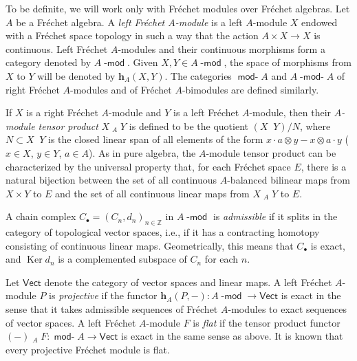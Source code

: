 \documentclass[12pt,reqno]{amsart}
\theoremstyle{definition}
\begin{document}
To be definite, we will work only with Fr\'echet modules over Fr\'echet algebras.
Let $A$ be a Fr\'echet algebra.
A {\em left Fr\'echet $A$-module} is a left $A$-module $X$ endowed with
a Fr\'echet space topology in such a way that the action $A\times X\to X$
is continuous.
Left Fr\'echet $A$-modules and their continuous morphisms form a category
denoted by $A{\mbox{-}\!\mathop{\mathsf{mod}}}$. Given $X,Y\in A{\mbox{-}\!\mathop{\mathsf{mod}}}$,
the space of morphisms from $X$ to $Y$ will be denoted by ${\mathbf h}_A(X,Y)$.
The categories ${\mathop{\mathsf{mod}}\!\mbox{-}} A$ and $A{\mbox{-}\!\mathop{\mathsf{mod}}\!\mbox{-}} A$ of right
Fr\'echet $A$-modules and of Fr\'echet $A$-bimodules are defined similarly.

If $X$ is a right Fr\'echet $A$-module and $Y$
is a left Fr\'echet $A$-module, then their {\em $A$-module tensor product}
$X{\mathop{\widehat\otimes}_{{A}}}Y$ is defined to be
the quotient $(X{\mathop{\widehat\otimes}} Y)/N$, where $N\subset X{\mathop{\widehat\otimes}} Y$
is the closed linear span of all elements of the form
$x\cdot a\otimes y-x\otimes a\cdot y$
($x\in X$, $y\in Y$, $a\in A$).
As in pure algebra, the $A$-module tensor product can be characterized
by the universal property that, for each Fr\'echet space $E$,
there is a natural bijection between the set of all
continuous $A$-balanced bilinear maps from $X\times Y$ to $E$
and the set of all continuous linear maps from
$X{\mathop{\widehat\otimes}_{{A}}}Y$ to $E$.

A chain complex $C_\bullet=(C_n,d_n)_{n\in{\mathbb Z}}$ in $A{\mbox{-}\!\mathop{\mathsf{mod}}}$ is {\em admissible} if
it splits in the category of topological vector spaces, i.e., if it has
a contracting homotopy consisting of continuous linear maps. Geometrically,
this means that $C_\bullet$ is exact, and $\operatorname{Ker} d_n$ is a complemented subspace
of $C_n$ for each $n$.

Let ${\mathsf{Vect}}$ denote the category of vector spaces and linear maps.
A left Fr\'echet $A$-module $P$ is {\em projective} if the functor
${\mathbf h}_A(P,-)\colon A{\mbox{-}\!\mathop{\mathsf{mod}}}\to{\mathsf{Vect}}$ is exact in the sense that it takes admissible sequences
of Fr\'echet $A$-modules to exact sequences of vector spaces.
A left Fr\'echet $A$-module $F$ is {\em flat} if the tensor product functor
$(-){\mathop{\widehat\otimes}_{{A}}} F\colon {\mathop{\mathsf{mod}}\!\mbox{-}} A\to{\mathsf{Vect}}$ is exact in the same sense as above.
It is known that every projective Fr\'echet module is flat.
\end{document}
